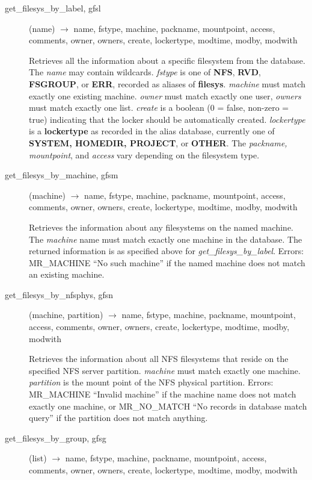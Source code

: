 \documentclass{article}
\begin{document}
\begin{description}

\item[ get\_filesys\_by\_label, gfsl](name) $\rightarrow$ name, fstype,
machine, packname, mountpoint, access, comments, owner, owners,
create, lockertype, modtime, modby, modwith

Retrieves all the information about a specific filesystem from the
database.  The {\em name} may contain wildcards.  {\em fstype} is one of
{\bf NFS}, {\bf RVD}, {\bf FSGROUP}, or {\bf ERR}, recorded as aliases of
{\bf filesys}.  {\em machine} must match exactly one existing machine.
{\em owner} must match exactly one user, {\em owners} must match exactly
one list.  {\em create} is a boolean (0 = false, non-zero = true)
indicating that the locker should be automatically created.
{\em lockertype} is a {\bf lockertype} as recorded in the alias database,
currently one of {\bf SYSTEM, HOMEDIR, PROJECT}, or {\bf OTHER}.  The
{\em packname, mountpoint}, and {\em access} vary depending on the
filesystem type.

\item[get\_filesys\_by\_machine, gfsm](machine) $\rightarrow$ name, fstype,
machine, packname, mountpoint, access, comments, owner, owners,
create, lockertype, modtime, modby, modwith

Retrieves the information about any filesystems on the named machine.
The {\em machine} name must match exactly one machine in the database.
The returned information is as specified above for
{\em get\_filesys\_by\_label}.  Errors: MR\_MACHINE ``No such machine'' if
the named machine does not match an existing machine.

\item[get\_filesys\_by\_nfsphys, gfsn](machine, partition)
$\rightarrow$ name, fstype, machine, packname, mountpoint, access, comments,
owner, owners, create, lockertype, modtime, modby, modwith

Retrieves the information about all NFS filesystems that reside on the
specified NFS server partition.  {\em machine} must match exactly one
machine.  {\em partition} is the mount point of the NFS physical
partition.  Errors: MR\_MACHINE ``Invalid machine'' if the machine name
does not match exactly one machine, or MR\_NO\_MATCH ``No records in
database match query'' if the partition does not match anything.

\item[get\_filesys\_by\_group, gfsg](list) $\rightarrow$ name, fstype,
machine, packname, mountpoint, access, comments, owner, owners,
create, lockertype, modtime, modby, modwith


\end{description}
\end{document}
